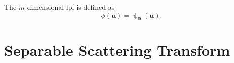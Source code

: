 \documentclass[journal]{IEEEtran}
\newcommand{\vect}[1]{\boldsymbol{\mathbf{#1}}}
\begin{document}
The $m$-dimensional \ac{lpf} is defined as 
\begin{equation}
    \phi(\vect{u}) = \uppsi_{\vect{0}}(\vect{u}).
\end{equation}







\section{Separable Scattering Transform} \label{sec:wst}
\end{document}
